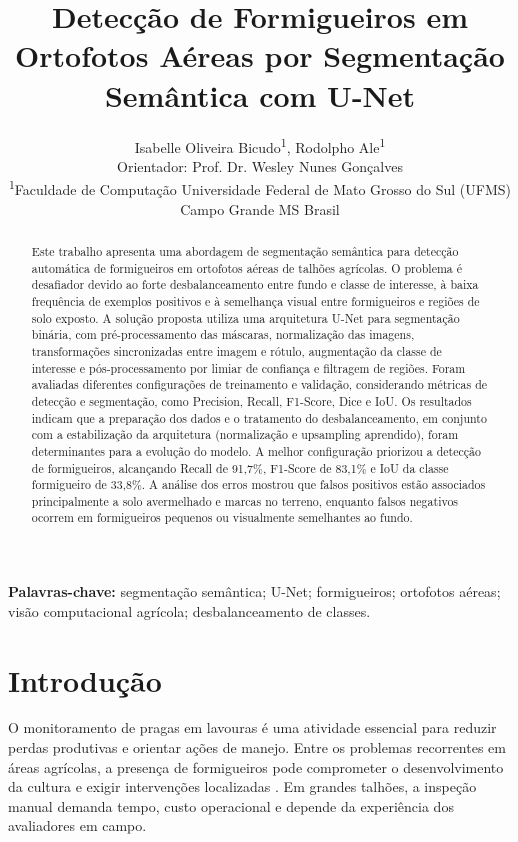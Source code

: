 \documentclass[10pt,a4paper,twocolumn]{article}
\title{\textbf{Detecção de Formigueiros em Ortofotos Aéreas por Segmentação Semântica com U-Net}}
\author{
Isabelle Oliveira Bicudo\textsuperscript{1},
Rodolpho Ale\textsuperscript{1}\\[0.4cm]
\small Orientador: Prof. Dr. Wesley Nunes Gonçalves\\[0.2cm]
\textsuperscript{1}\small Faculdade de Computação Universidade Federal de Mato Grosso do Sul (UFMS)\\
\small Campo Grande MS Brasil
}
\date{}
\date{}
\begin{document}
\maketitle

\begin{abstract}
Este trabalho apresenta uma abordagem de segmentação semântica para detecção automática de formigueiros em ortofotos aéreas de talhões agrícolas. O problema é desafiador devido ao forte desbalanceamento entre fundo e classe de interesse, à baixa frequência de exemplos positivos e à semelhança visual entre formigueiros e regiões de solo exposto. A solução proposta utiliza uma arquitetura U-Net para segmentação binária, com pré-processamento das máscaras, normalização das imagens, transformações sincronizadas entre imagem e rótulo, augmentação da classe de interesse e pós-processamento por limiar de confiança e filtragem de regiões. Foram avaliadas diferentes configurações de treinamento e validação, considerando métricas de detecção e segmentação, como Precision, Recall, F1-Score, Dice e IoU. Os resultados indicam que a preparação dos dados e o tratamento do desbalanceamento, em conjunto com a estabilização da arquitetura (normalização e upsampling aprendido), foram determinantes para a evolução do modelo. A melhor configuração priorizou a detecção de formigueiros, alcançando Recall de 91,7\%, F1-Score de 83,1\% e IoU da classe formigueiro de 33,8\%. A análise dos erros mostrou que falsos positivos estão associados principalmente a solo avermelhado e marcas no terreno, enquanto falsos negativos ocorrem em formigueiros pequenos ou visualmente semelhantes ao fundo.
\end{abstract}

\noindent\textbf{Palavras-chave:} segmentação semântica; U-Net; formigueiros; ortofotos aéreas; visão computacional agrícola; desbalanceamento de classes.

\section{Introdução}

O monitoramento de pragas em lavouras é uma atividade essencial para reduzir perdas produtivas e orientar ações de manejo. Entre os problemas recorrentes em áreas agrícolas, a presença de formigueiros pode comprometer o desenvolvimento da cultura e exigir intervenções localizadas \cite{dellalucia2014}. Em grandes talhões, a inspeção manual demanda tempo, custo operacional e depende da experiência dos avaliadores em campo.
\end{document}

